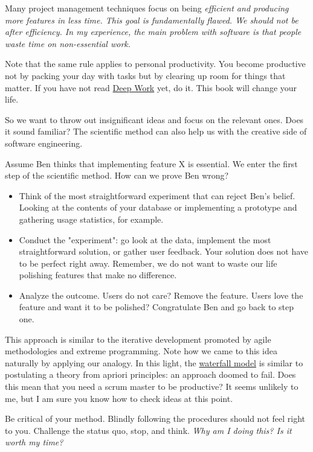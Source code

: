 \documentclass{article}
\begin{document}
Many project management techniques focus on being \em{efficient} and producing more features in less time.
This goal is fundamentally flawed.
We should not be after efficiency.
In my experience, the main problem with software is that people waste time on non-essential work.

Note that the same rule applies to personal productivity.
You become productive not by packing your day with tasks but by clearing up room for things that matter.
If you have not read \href{https://www.amazon.com/-/en/dp/1455586692}{Deep Work} yet, do it.
This book will change your life.

So we want to throw out insignificant ideas and focus on the relevant ones.
Does it sound familiar?
The scientific method can also help us with the creative side of software engineering.

Assume Ben thinks that implementing feature X is essential.
We enter the first step of the scientific method.
How can we prove Ben wrong?
\begin{itemize}
  \item 
    Think of the most straightforward experiment that can reject Ben's belief.
    Looking at the contents of your database or implementing a prototype and gathering usage statistics, for example.
  \item 
    Conduct the "experiment": go look at the data, implement the most straightforward solution, or gather user feedback.
    Your solution does not have to be perfect right away.
    Remember, we do not want to waste our life polishing features that make no difference.
  \item 
    Analyze the outcome.
    Users do not care?
    Remove the feature.
    Users love the feature and want it to be polished?
    Congratulate Ben and go back to step one.
\end{itemize}

This approach is similar to the iterative development promoted by agile methodologies and extreme programming.
Note how we came to this idea naturally by applying our analogy.
In this light, the \href{https://en.wikipedia.org/wiki/Waterfall_model}{waterfall model} is similar to postulating a theory from apriori principles: an approach doomed to fail.
Does this mean that you need a scrum master to be productive?
It seems unlikely to me, but I am sure you know how to check ideas at this point.

Be critical of your method.
Blindly following the procedures should not feel right to you.
Challenge the status quo, stop, and think.
\em{Why am I doing this?}
\em{Is it worth my time?}
\end{document}
